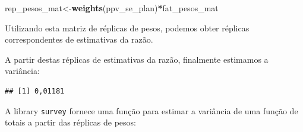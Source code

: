 \documentclass[]{book}
\newenvironment{Shaded}{\begin{snugshade}}{\end{snugshade}}
\newcommand{\KeywordTok}[1]{\textcolor[rgb]{0.13,0.29,0.53}{\textbf{#1}}}
\newcommand{\DecValTok}[1]{\textcolor[rgb]{0.00,0.00,0.81}{#1}}
\newcommand{\StringTok}[1]{\textcolor[rgb]{0.31,0.60,0.02}{#1}}
\newcommand{\ControlFlowTok}[1]{\textcolor[rgb]{0.13,0.29,0.53}{\textbf{#1}}}
\newcommand{\OperatorTok}[1]{\textcolor[rgb]{0.81,0.36,0.00}{\textbf{#1}}}
\newcommand{\NormalTok}[1]{#1}
\theoremstyle{definition}
\theoremstyle{definition}
\theoremstyle{definition}
\theoremstyle{remark}
\begin{document}
\begin{Shaded}
\begin{Highlighting}[]
\NormalTok{rep_pesos_mat<-}\KeywordTok{weights}\NormalTok{(ppv_se_plan)}\OperatorTok{*}\NormalTok{fat_pesos_mat}
\end{Highlighting}
\end{Shaded}

Utilizando esta matriz de réplicas de pesos, podemos obter réplicas
correspondentes de estimativas da razão.

\begin{Shaded}
\end{Shaded}

A partir destas réplicas de estimativas da razão, finalmente estimamos a
variância:

\begin{Shaded}
\end{Shaded}

\begin{verbatim}
## [1] 0,01181
\end{verbatim}

A library \texttt{survey} \citep{R-survey} fornece uma função para
estimar a variância de uma função de totais a partir das réplicas de
pesos:
\end{document}
